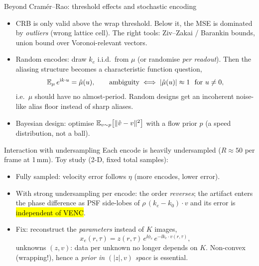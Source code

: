 \iflong
\begin{frame}{Beyond Cram\'er--Rao: threshold effects and stochastic encoding}
\begin{itemize}
\item CRB is only valid above the wrap threshold. Below it, the MSE is dominated by \emph{outliers} (wrong lattice cell). The right tools: Ziv--Zakai / Barankin bounds, union bound over Voronoi-relevant vectors.
\item Random encodes: draw $k_e$ i.i.d.\ from $\mu$ (or randomise \emph{per readout}). Then the aliasing structure becomes a characteristic function question,
\[ \mathbb E_\mu\, e^{\mathrm i k\cdot u}=\hat\mu(u),\qquad \text{ambiguity}\iff|\hat\mu(u)|\approx 1\ \ \text{for } u\neq0 , \]
i.e.\ $\mu$ should have no almost-period. Random designs get an incoherent noise-like alias floor instead of sharp aliases.
\item Bayesian design: optimise $\mathbb E_{v\sim p}\big[\|\hat v-v\|^2\big]$ with a flow prior $p$ (a speed distribution, not a ball).
\end{itemize}
\end{frame}
\fi

\iflong
\begin{frame}{Interaction with undersampling}
\small
Each encode is heavily undersampled ($R\approx50$ per frame at 1\,mm). Toy study (2-D, fixed total samples):
\begin{itemize}
\item Fully sampled: velocity error follows $\eta$ (more encodes, lower error).
\item With strong undersampling per encode: the order \emph{reverses}; the artifact enters the phase difference as PSF side-lobes of $\rho\,(k_e-k_0)\!\cdot v$ and its error is \hl{independent of VENC}.
\item Fix: reconstruct the \emph{parameters} instead of $K$ images,
\[ x_e(r,\tau)=z(r,\tau)\,e^{\ii\phi_e}\,e^{-\ii k_e\cdot v(r,\tau)},\]
unknowns $(z,v)$: data per unknown no longer depends on $K$. Non-convex (wrapping!), hence a \emph{prior in $(|z|,v)$ space} is essential.
\end{itemize}
\end{frame}
\fi
